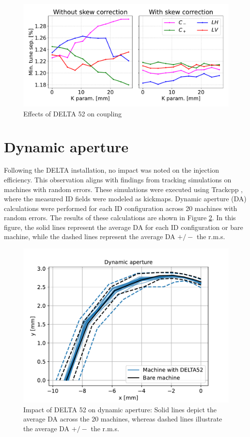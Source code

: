 \documentclass[a4paper,
               keeplastbox,   %
               ]{jacow}
\begin{document}
\begin{figure}[!h]
    \centering
   \includegraphics[width=\columnwidth]{coupling.pdf}
   \caption{Effects of DELTA 52 on coupling}
   \label{fig:coupling}
\end{figure}


\section{Dynamic aperture}

Following the DELTA installation, no impact was noted on the injection efficiency. This observation aligns with findings from tracking simulations on machines with random errors. These simulations were executed using Trackcpp \cite{Trackcpp}, where the measured ID fields were modeled as kickmaps. Dynamic aperture (DA) calculations were performed for each ID configuration across 20 machines with random errors. The results of these calculations are shown in Figure \ref{fig:dynapt}. In this figure, the solid lines represent the average DA for each ID configuration or bare machine, while the dashed lines represent the average DA $+/-$ the r.m.s.


\begin{figure}[!h]
    \centering
   \includegraphics[width=0.9\columnwidth]{dynapt.pdf}
   \caption{Impact of DELTA 52 on dynamic aperture: Solid lines depict the average  DA across the 20 machines, whereas dashed lines illustrate the average DA $+/-$ the r.m.s.}
   \label{fig:dynapt}
\end{figure}
\end{document}
